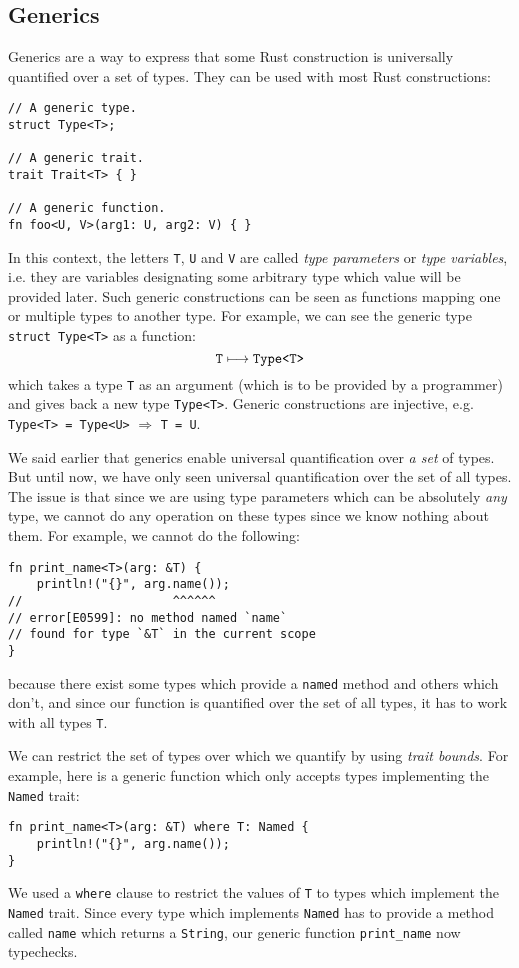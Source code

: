 \documentclass[twocolumn]{article}
\newcommand{\rust}[1]{\texttt{#1}}
\newcommand{\mrust}[1]{\text{\rust{#1}}}
\begin{document}
\subsection{Generics} \label{generics}
Generics are a way to express that some Rust construction is universally quantified over a set of types. They can be used with most Rust constructions:
\begin{verbatim}
// A generic type.
struct Type<T>;

// A generic trait.
trait Trait<T> { }

// A generic function.
fn foo<U, V>(arg1: U, arg2: V) { }
\end{verbatim}
In this context, the letters \rust{T}, \rust{U} and  \rust{V} are called \textit{type parameters} or \textit{type variables}, i.e. they are variables designating some arbitrary type which value will be provided later. Such generic constructions can be seen as functions mapping one or multiple types to another type. For example, we can see the generic type \rust{struct Type<T>} as a function:
\[
    \mrust{T} \longmapsto \mrust{Type<T>}
\]
which takes a type \rust{T} as an argument (which is to be provided by a programmer) and gives back a new type \rust{Type<T>}. Generic constructions are injective, e.g. \rust{Type<T> = Type<U>} $\Longrightarrow$ \rust{T = U}.

We said earlier that generics enable universal quantification over \textit{a set} of types. But until now, we have only seen universal quantification over the set of all types. The issue is that since we are using type parameters which can be absolutely \textit{any} type, we cannot do any operation on these types since we know nothing about them. For example, we cannot do the following:
\begin{verbatim}
fn print_name<T>(arg: &T) {
    println!("{}", arg.name());
//                     ^^^^^^
// error[E0599]: no method named `name`
// found for type `&T` in the current scope
}
\end{verbatim}
because there exist some types which provide a \rust{named} method and others which don't, and since our function is quantified over the set of all types, it has to work with all types \rust{T}.

We can restrict the set of types over which we quantify by using \textit{trait bounds}. For example, here is a generic function which only accepts types implementing the \rust{Named} trait:
\begin{verbatim}
fn print_name<T>(arg: &T) where T: Named {
    println!("{}", arg.name());
}
\end{verbatim}
We used a \rust{where} clause to restrict the values of \rust{T} to types which implement the \rust{Named} trait. Since every type which implements \rust{Named} has to provide a method called \rust{name} which returns a \rust{String}, our generic function \rust{print_name} now typechecks.
\end{document}
